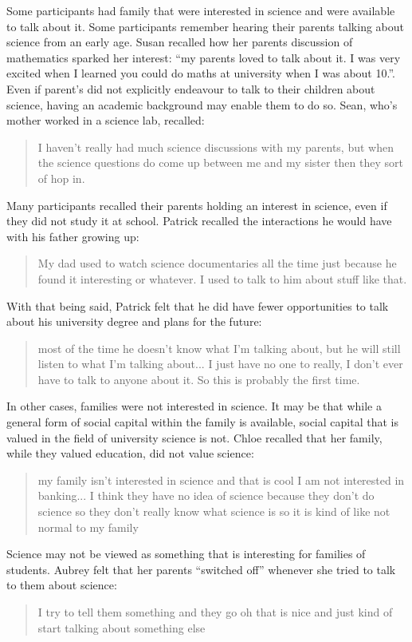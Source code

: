 Some participants had family that were interested in science and were available to  talk about it. Some participants remember hearing their parents talking about science from an early age. Susan recalled how her parents discussion of mathematics sparked her interest: ``my parents loved to talk about it. I was very excited when I learned you could do maths at university when I was about 10.''. Even if parent's did not explicitly endeavour to talk to their children about science, having an academic background may enable them to do so. Sean, who's mother worked in a science lab, recalled: \blockquote{I haven't really had much science discussions with my parents, but when the science questions do come up between me and my sister then they sort of hop in.} Many participants recalled their parents holding an interest in science, even if they did not study it at school. Patrick recalled the interactions he would have with his father growing up: \blockquote{My dad used to watch science documentaries all the time just because he found it interesting or whatever. I used to talk to him about stuff like that.}. With that being said, Patrick felt that he did have fewer opportunities to talk about his university degree and plans for the future: \blockquote{most of the time he doesn't know what I’m talking about, but he will still listen to what I’m talking about...  I just have no one to really, I don’t ever have to talk to anyone about it. So this is probably the first time.}

In other cases, families were not interested in science. It may be that while a general form of social capital within the family is available, social capital that is valued in the field of university science is not. Chloe recalled that her family, while they valued education, did not value science: \blockquote{my family isn't interested in science and that is cool I am not interested in banking... I think they have no idea of science because they don’t do science so they don't really know what science is so it is kind of like not normal to my family}. Science may not be viewed as something that is interesting for families of students. Aubrey felt that her parents ``switched off'' whenever she tried to talk to them about science: \blockquote{I try to tell them something and they go oh that is nice and just kind of start talking about something else}.

